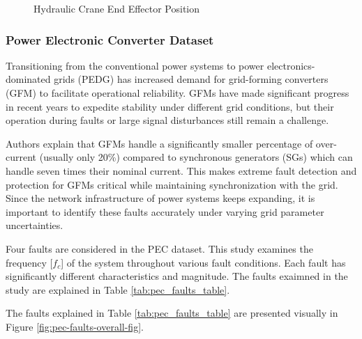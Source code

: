 \begin{figure}[H]
    
    \caption{Hydraulic Crane End Effector Position}
    \label{fig:hydraulic_pos}
\end{figure}

\subsubsection{Power Electronic Converter Dataset}
\label{ref_pec_dataset}

Transitioning from the conventional power systems to power electronics-dominated grids (PEDG) has increased demand for grid-forming converters (GFM) to facilitate operational reliability. GFMs have made significant progress in recent years %
to expedite stability under different grid conditions, but their operation during faults or large signal disturbances still remain a challenge.

Authors \cite{trainsient-stability-9523750} explain that GFMs handle a significantly smaller percentage of over-current (usually only 20\%) compared to synchronous generators (SGs) which can handle seven times their nominal current. This makes extreme fault detection and protection for GFMs critical while maintaining synchronization with the grid. Since the network infrastructure of power systems keeps expanding, it is important to identify these faults accurately under varying grid parameter uncertainties.


Four faults are considered in the PEC dataset. This study examines the frequency [$f_c$] of the system throughout various fault conditions. Each fault has significantly different characteristics and magnitude. The faults exaimned in the study are explained in Table \ref{tab:pec_faults_table}.



The faults explained in Table \ref{tab:pec_faults_table} are presented visually in Figure \ref{fig:pec-faults-overall-fig}.
 
